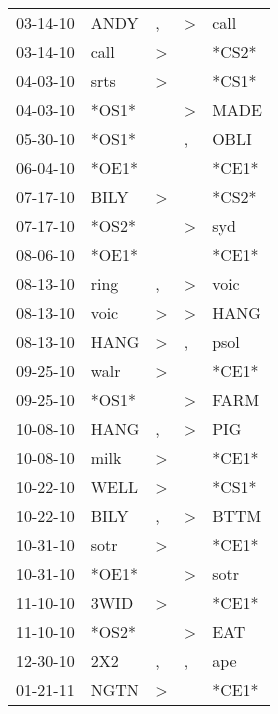 \begin{supertabular}{lllll}
 03-14-10 &   ANDY &                , &     \textgreater &   call \\
 03-14-10 &   call &     \textgreater &                  &  *CS2* \\
 04-03-10 &   srts &     \textgreater &                  &  *CS1* \\
 04-03-10 &  *OS1* &                  &     \textgreater &   MADE \\
 05-30-10 &  *OS1* &                  &                , &   OBLI \\
 06-04-10 &  *OE1* &                  &                  &  *CE1* \\
 07-17-10 &   BILY &     \textgreater &                  &  *CS2* \\
 07-17-10 &  *OS2* &                  &     \textgreater &    syd \\
 08-06-10 &  *OE1* &                  &                  &  *CE1* \\
 08-13-10 &   ring &                , &     \textgreater &   voic \\
 08-13-10 &   voic &     \textgreater &     \textgreater &   HANG \\
 08-13-10 &   HANG &     \textgreater &                , &   psol \\
 09-25-10 &   walr &     \textgreater &                  &  *CE1* \\
 09-25-10 &  *OS1* &                  &     \textgreater &   FARM \\
 10-08-10 &   HANG &                , &     \textgreater &    PIG \\
 10-08-10 &   milk &     \textgreater &                  &  *CE1* \\
 10-22-10 &   WELL &     \textgreater &                  &  *CS1* \\
 10-22-10 &   BILY &                , &     \textgreater &   BTTM \\
 10-31-10 &   sotr &     \textgreater &                  &  *CE1* \\
 10-31-10 &  *OE1* &                  &     \textgreater &   sotr \\
 11-10-10 &   3WID &     \textgreater &                  &  *CE1* \\
 11-10-10 &  *OS2* &                  &     \textgreater &    EAT \\
 12-30-10 &    2X2 &                , &                , &    ape \\
 01-21-11 &   NGTN &     \textgreater &                  &  *CE1* \\

\end{supertabular}
